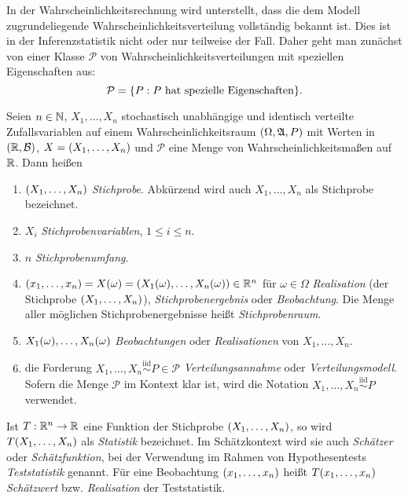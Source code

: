 \documentclass{lecture}
\begin{document}
    In der Wahrscheinlichkeitsrechnung wird unterstellt, dass die dem Modell zugrundeliegende Wahrscheinlichkeitsverteilung vollständig bekannt ist.
    Dies ist in der Inferenzstatistik nicht oder nur teilweise der Fall.
    Daher geht man zunächst von einer Klasse \(\mathcal{P}\) von Wahrscheinlichkeitsverteilungen mit speziellen Eigenschaften aus:
    \[
        \mathcal{P} = \braces*{P : P\text{ hat spezielle Eigenschaften}}.
    \]

    \begin{definition}
        Seien \(n \in \N\), \(X_1, \ldots, X_n\) stochastisch unabhängige und identisch verteilte Zufallsvariablen auf einem Wahrscheinlichkeitsraum \(\parentheses*{\Omega, \mathfrak{A}, P}\) mit Werten in \(\parentheses*{\R, \mathcal{B}}\), \(X = \parentheses*{X_1, \ldots, X_n}\) und \(\mathcal{P}\) eine Menge von Wahrscheinlichkeitsmaßen auf \(\R\).
        Dann heißen
        \begin{enumerate}
            \item \(\parentheses*{X_1, \ldots, X_n}\) \emph{Stichprobe}.
            Abkürzend wird auch \(X_1, \ldots, X_n\) als Stichprobe bezeichnet.
            \item \(X_i\) \emph{Stichprobenvariablen}, \(1 \le i \le n\).
            \item \(n\) \emph{Stichprobenumfang}.
            \item \(\parentheses*{x_1, \ldots, x_n} = X\parentheses*{\omega} = \parentheses*{X_1\parentheses*{\omega}, \ldots, X_n\parentheses*{\omega}} \in \R^n\) für \(\omega \in \Omega\) \emph{Realisation} (der Stichprobe \(\parentheses*{X_1, \ldots, X_n}\)), \emph{Stichprobenergebnis} oder \emph{Beobachtung}.
            Die Menge aller möglichen Stichprobenergebnisse heißt \emph{Stichprobenraum}.
            \item \(X_1\parentheses*{\omega}, \ldots, X_n\parentheses*{\omega}\) \emph{Beobachtungen} oder \emph{Realisationen} von \(X_1, \ldots, X_n\).
            \item die Forderung \(X_1, \ldots, X_n \stackrel{\text{iid}}{\sim} P \in \mathcal{P}\) \emph{Verteilungsannahme} oder \emph{Verteilungsmodell}.
            Sofern die Menge \(\mathcal{P}\) im Kontext klar ist, wird die Notation \(X_1, \ldots, X_n \stackrel{\text{iid}}{\sim} P\) verwendet.
        \end{enumerate}
        Ist \(T: \R^n \to \R\) eine Funktion der Stichprobe \(\parentheses*{X_1, \ldots, X_n}\), so wird \(T\parentheses*{X_1, \ldots, X_n}\) als \emph{Statistik} bezeichnet.
        Im Schätzkontext wird sie auch \emph{Schätzer} oder \emph{Schätzfunktion}, bei der Verwendung im Rahmen von Hypothesentests \emph{Teststatistik} genannt.
        Für eine Beobachtung \(\parentheses*{x_1, \ldots, x_n}\) heißt \(T\parentheses*{x_1, \ldots, x_n}\) \emph{Schätzwert} bzw. \emph{Realisation} der Teststatistik.
    \end{definition}
\end{document}
